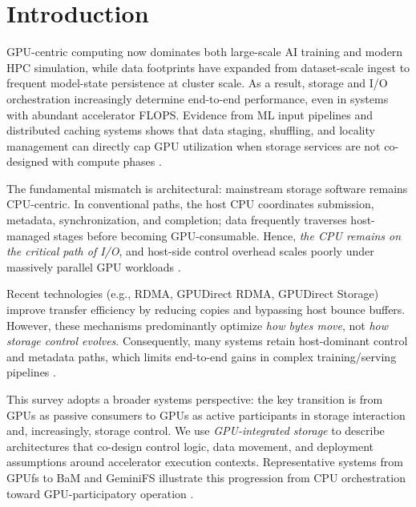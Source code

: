 \section{Introduction}

GPU-centric computing now dominates both large-scale AI training and modern HPC simulation, while data footprints have expanded from dataset-scale ingest to frequent model-state persistence at cluster scale. As a result, storage and I/O orchestration increasingly determine end-to-end performance, even in systems with abundant accelerator FLOPS. Evidence from ML input pipelines and distributed caching systems shows that data staging, shuffling, and locality management can directly cap GPU utilization when storage services are not co-designed with compute phases \cite{murray2021tfdata,hoard2018,zhang2025hpcstoragesurvey,rajbhandari2021zeroinfinity}.

The fundamental mismatch is architectural: mainstream storage software remains CPU-centric. In conventional paths, the host CPU coordinates submission, metadata, synchronization, and completion; data frequently traverses host-managed stages before becoming GPU-consumable. Hence, \emph{the CPU remains on the critical path of I/O}, and host-side control overhead scales poorly under massively parallel GPU workloads \cite{linux_io_uring,spdk_overview,nvme_spec,silberstein2013gpufs,shahar2016gpufs}.

Recent technologies (e.g., RDMA, GPUDirect RDMA, GPUDirect Storage) improve transfer efficiency by reducing copies and bypassing host bounce buffers. However, these mechanisms predominantly optimize \emph{how bytes move}, not \emph{how storage control evolves}. Consequently, many systems retain host-dominant control and metadata paths, which limits end-to-end gains in complex training/serving pipelines \cite{infiniband_spec,nvidia_gdrdma,nvidia_gds_blog,nvidia_gds_overview,traub2023compstoragesurvey}.

This survey adopts a broader systems perspective: the key transition is from GPUs as passive consumers to GPUs as active participants in storage interaction and, increasingly, storage control. We use \emph{GPU-integrated storage} to describe architectures that co-design control logic, data movement, and deployment assumptions around accelerator execution contexts. Representative systems from GPUfs to BaM and GeminiFS illustrate this progression from CPU orchestration toward GPU-participatory operation \cite{silberstein2013gpufs,qureshi2023bam,geminifs2025}.

